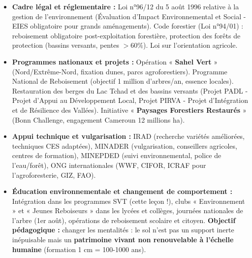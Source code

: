 \documentclass[11pt]{article}
\begin{document}
\begin{itemize}
    \item \textbf{Cadre légal et réglementaire :} Loi n°96/12 du 5 août 1996 relative à la gestion de l'environnement (Évaluation d'Impact Environnemental et Social - EIES obligatoire pour grands aménagements). Code forestier (Loi n°94/01) : reboisement obligatoire post-exploitation forestière, protection des forêts de protection (bassins versants, pentes $> 60\%$). Loi sur l'orientation agricole.
    \item \textbf{Programmes nationaux et projets :} Opération « \textbf{Sahel Vert} » (Nord/Extrême-Nord, fixation dunes, parcs agroforestiers). Programme National de Reboisement (objectif 1 million d'arbres/an, essence locales). Restauration des berges du Lac Tchad et des bassins versants (Projet PADL - Projet d'Appui au Développement Local, Projet PIRVA - Projet d'Intégration et de Résilience des Vallées). Initiative « \textbf{Paysages Forestiers Restaurés} » (Bonn Challenge, engagement Cameroun 12 millions ha).
    \item \textbf{Appui technique et vulgarisation :} IRAD (recherche variétés améliorées, techniques CES adaptées), MINADER (vulgarisation, conseillers agricoles, centres de formation), MINEPDED (suivi environnemental, police de l'eau/forêt), ONG internationales (WWF, CIFOR, ICRAF pour l'agroforesterie, GIZ, FAO).
    \item \textbf{Éducation environnementale et changement de comportement :} Intégration dans les programmes SVT (cette leçon !), clubs « Environnement » et « Jeunes Reboiseurs » dans les lycées et collèges, journées nationales de l'arbre (1er août), opérations de reboisement scolaire et citoyen. \textbf{Objectif pédagogique :} changer les mentalités : le sol n'est pas un support inerte inépuisable mais un \textbf{patrimoine vivant non renouvelable à l'échelle humaine} (formation 1 cm = 100-1000 ans).
\end{itemize}
\end{document}
